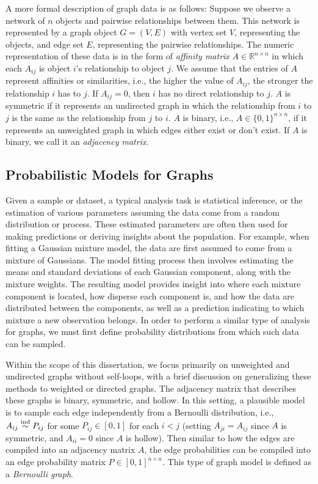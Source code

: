 \documentclass[
  11pt,
]{article}
\begin{document}
A more formal description of graph data is as follows: Suppose we
observe a network of \(n\) objects and pairwise relationships between
them. This network is represented by a graph object \(G = (V, E)\) with
vertex set \(V\), representing the objects, and edge set \(E\),
representing the pairwise relationships. The numeric representation of
these data is in the form of \emph{affinity matrix}
\(A \in \mathbb{R}^{n \times n}\) in which each \(A_{ij}\) is object
\(i\)'s relationship to object \(j\). We assume that the entries of
\(A\) represent affinities or similarities, i.e., the higher the value
of \(A_{ij}\), the stronger the relationship \(i\) has to \(j\). If
\(A_{ij} = 0\), then \(i\) has no direct relationship to \(j\). \(A\) is
symmetric if it represents an undirected graph in which the relationship
from \(i\) to \(j\) is the same as the relationship from \(j\) to \(i\).
\(A\) is binary, i.e., \(A \in \{0, 1\}^{n \times n}\), if it represents
an unweighted graph in which edges either exist or don't exist. If \(A\)
is binary, we call it an \emph{adjacency matrix}.

\hypertarget{probabilistic-models-for-graphs}{%
\subsection{Probabilistic Models for
Graphs}\label{probabilistic-models-for-graphs}}

Given a sample or dataset, a typical analysis task is statistical
inference, or the estimation of various parameters assuming the data
come from a random distribution or process. These estimated parameters
are often then used for making predictions or deriving insights about
the population. For example, when fitting a Gaussian mixture model, the
data are first assumed to come from a mixture of Gaussians. The model
fitting process then involves estimating the means and standard
deviations of each Gaussian component, along with the mixture weights.
The resulting model provides insight into where each mixture component
is located, how disperse each component is, and how the data are
distributed between the components, as well as a prediction indicating
to which mixture a new observation belongs. In order to perform a
similar type of analysis for graphs, we must first define probability
distributions from which such data can be sampled.

Within the scope of this dissertation, we focus primarily on unweighted
and undirected graphs without self-loops, with a brief discussion on
generalizing these methods to weighted or directed graphs. The adjacency
matrix that describes these graphs is binary, symmetric, and hollow. In
this setting, a plausible model is to sample each edge independently
from a Bernoulli distribution, i.e., \(A_{ij} \stackrel{\mathrm{ind}}{\sim} P_{ij}\) for some
\(P_{ij} \in [0, 1]\) for each \(i < j\) (setting \(A_{ji} = A_{ij}\)
since \(A\) is symmetric, and \(A_{ii} = 0\) since \(A\) is hollow).
Then similar to how the edges are compiled into an adjacency matrix
\(A\), the edge probabilities can be compiled into an edge probability
matrix \(P \in [0, 1]^{n \times n}\). This type of graph model is
defined as a \emph{Bernoulli graph}.
\end{document}
